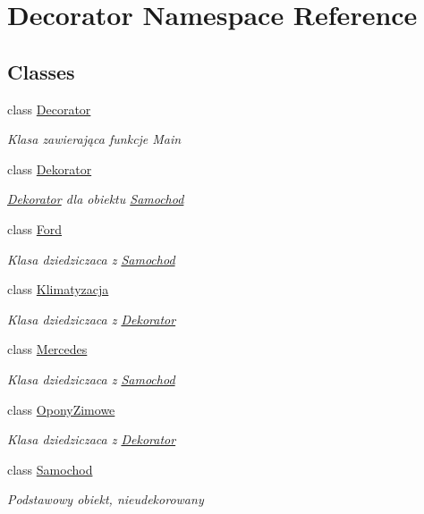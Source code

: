 \hypertarget{namespace_decorator}{}\section{Decorator Namespace Reference}
\label{namespace_decorator}
\subsection*{Classes}
\begin{DoxyCompactItemize}
\item 
class \hyperlink{class_decorator_1_1_decorator}{Decorator}
\begin{DoxyCompactList}\small\item\em Klasa zawierająca funkcje Main \end{DoxyCompactList}\item 
class \hyperlink{class_decorator_1_1_dekorator}{Dekorator}
\begin{DoxyCompactList}\small\item\em \hyperlink{class_decorator_1_1_dekorator}{Dekorator} dla obiektu \hyperlink{class_decorator_1_1_samochod}{Samochod} \end{DoxyCompactList}\item 
class \hyperlink{class_decorator_1_1_ford}{Ford}
\begin{DoxyCompactList}\small\item\em Klasa dziedziczaca z \hyperlink{class_decorator_1_1_samochod}{Samochod} \end{DoxyCompactList}\item 
class \hyperlink{class_decorator_1_1_klimatyzacja}{Klimatyzacja}
\begin{DoxyCompactList}\small\item\em Klasa dziedziczaca z \hyperlink{class_decorator_1_1_dekorator}{Dekorator} \end{DoxyCompactList}\item 
class \hyperlink{class_decorator_1_1_mercedes}{Mercedes}
\begin{DoxyCompactList}\small\item\em Klasa dziedziczaca z \hyperlink{class_decorator_1_1_samochod}{Samochod} \end{DoxyCompactList}\item 
class \hyperlink{class_decorator_1_1_opony_zimowe}{Opony\+Zimowe}
\begin{DoxyCompactList}\small\item\em Klasa dziedziczaca z \hyperlink{class_decorator_1_1_dekorator}{Dekorator} \end{DoxyCompactList}\item 
class \hyperlink{class_decorator_1_1_samochod}{Samochod}
\begin{DoxyCompactList}\small\item\em Podstawowy obiekt, nieudekorowany \end{DoxyCompactList}\end{DoxyCompactItemize}
